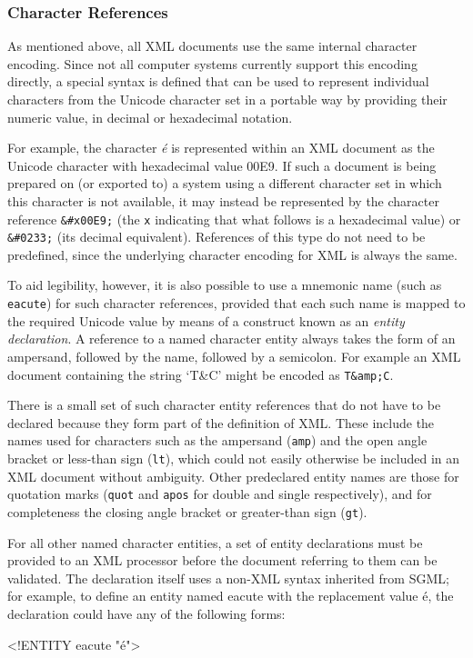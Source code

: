 \subsubsection[{Character References}]{Character References}\label{SG-er}\par
As mentioned above, all XML documents use the same internal character encoding. Since not all computer systems currently support this encoding directly, a special syntax is defined that can be used to represent individual characters from the Unicode character set in a portable way by providing their numeric value, in decimal or hexadecimal notation.\par
For example, the character \textit{é} is represented within an XML document as the Unicode character with hexadecimal value 00E9. If such a document is being prepared on (or exported to) a system using a different character set in which this character is not available, it may instead be represented by the character reference \texttt{\&\#x00E9;} (the \texttt{x} indicating that what follows is a hexadecimal value) or \texttt{\&\#0233;} (its decimal equivalent). References of this type do not need to be predefined, since the underlying character encoding for XML is always the same.\par
To aid legibility, however, it is also possible to use a mnemonic name (such as \texttt{eacute}) for such character references, provided that each such name is mapped to the required Unicode value by means of a construct known as an \textit{entity declaration}. A reference to a named character entity always takes the form of an ampersand, followed by the name, followed by a semicolon. For example an XML document containing the string ‘T\&C’ might be encoded as \texttt{T\&amp;C}.\par
There is a small set of such character entity references that do not have to be declared because they form part of the definition of XML. These include the names used for characters such as the ampersand (\texttt{amp}) and the open angle bracket or less-than sign (\texttt{lt}), which could not easily otherwise be included in an XML document without ambiguity. Other predeclared entity names are those for quotation marks (\texttt{quot} and \texttt{apos} for double and single respectively), and for completeness the closing angle bracket or greater-than sign (\texttt{gt}).\par
For all other named character entities, a set of entity declarations must be provided to an XML processor before the document referring to them can be validated. The declaration itself uses a non-XML syntax inherited from SGML; for example, to define an entity named \textsf{eacute} with the replacement value é, the declaration could have any of the following forms: \par\hfill\bgroup\exampleFont\vskip 10pt\begin{shaded}
\obeyspaces <!ENTITY eacute "é">\end{shaded}
